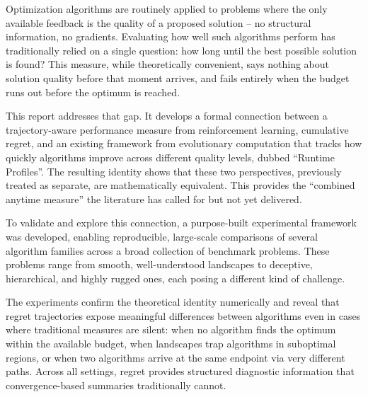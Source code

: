 %
Optimization algorithms are routinely applied to problems where the
only available feedback is the quality of a proposed solution -- no
structural information, no gradients. Evaluating how well such
algorithms perform has traditionally relied on a single question: how
long until the best possible solution is found? This measure, while
theoretically convenient, says nothing about solution quality before
that moment arrives, and fails entirely when the budget runs out
before the optimum is reached.

This report addresses that gap. It develops a formal connection
between a trajectory-aware performance measure from reinforcement learning, 
cumulative regret, and an existing framework from evolutionary
computation that tracks how quickly algorithms improve across
different quality levels, dubbed ``Runtime Profiles''. The resulting identity shows that these two
perspectives, previously treated as separate, are mathematically
equivalent. This provides the ``combined anytime measure'' the
literature has called for but not yet delivered.

To validate and explore this connection, a purpose-built experimental
framework was developed, enabling reproducible, large-scale
comparisons of several algorithm families across a broad collection
of benchmark problems. These problems range from smooth,
well-understood landscapes to deceptive, hierarchical, and highly
rugged ones, each posing a different kind of challenge.

The experiments confirm the theoretical identity numerically and
reveal that regret trajectories expose meaningful differences between
algorithms even in cases where traditional measures are silent: when
no algorithm finds the optimum within the available budget, when
landscapes trap algorithms in suboptimal regions, or when two
algorithms arrive at the same endpoint via very different paths.
Across all settings, regret provides structured diagnostic
information that convergence-based summaries traditionally cannot.
